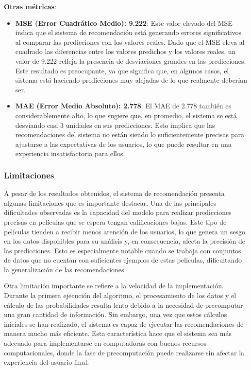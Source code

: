 \documentclass[twocolumn, fontsize=10pt]{article}
\begin{document}
\textbf{Otras métricas}:
\begin{itemize}
    \item \textbf{MSE (Error Cuadrático Medio): 9.222}: Este valor elevado del MSE indica que el sistema de recomendación está generando errores significativos al comparar las predicciones con los valores reales. Dado que el MSE eleva al cuadrado las diferencias entre los valores predichos y los valores reales, un valor de 9.222 refleja la presencia de desviaciones grandes en las predicciones. Este resultado es preocupante, ya que significa que, en algunos casos, el sistema está haciendo predicciones muy alejadas de lo que realmente deberían ser.
    \item \textbf{MAE (Error Medio Absoluto): 2.778}: El MAE de 2.778 también es considerablemente alto, lo que sugiere que, en promedio, el sistema se está desviando casi 3 unidades en sus predicciones. Esto implica que las recomendaciones del sistema no están siendo lo suficientemente precisas para ajustarse a las expectativas de los usuarios, lo que puede resultar en una experiencia insatisfactoria para ellos.
\end{itemize}

\subsubsection{Limitaciones}

A pesar de los resultados obtenidos, el sistema de recomendación presenta algunas limitaciones que es importante destacar. Una de las principales dificultades observadas es la capacidad del modelo para realizar predicciones precisas en películas que se espera tengan calificaciones bajas. Este tipo de películas tienden a recibir menos atención de los usuarios, lo que genera un sesgo en los datos disponibles para su análisis y, en consecuencia, afecta la precisión de las predicciones. Esto es especialmente notable cuando se trabaja con conjuntos de datos que no cuentan con suficientes ejemplos de estas películas, dificultando la generalización de las recomendaciones.

Otra limitación importante se refiere a la velocidad de la implementación. Durante la primera ejecución del algoritmo, el procesamiento de los datos y el cálculo de las probabilidades resulta lento debido a la necesidad de precomputar una gran cantidad de información. Sin embargo, una vez que estos cálculos iniciales se han realizado, el sistema es capaz de ejecutar las recomendaciones de manera mucho más eficiente. Esta característica hace que el sistema sea más adecuado para implementarse en computadoras con buenos recursos computacionales, donde la fase de precomputación puede realizarse sin afectar la experiencia del usuario final.
\end{document}
